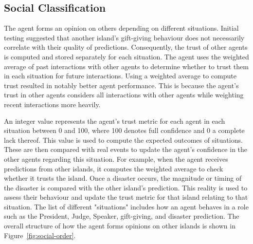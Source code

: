 \begin{figure}
    \centering
\end{figure}



\subsection{Social Classification}
The agent forms an opinion on others depending on different situations. Initial testing suggested that another island's gift-giving behaviour does not necessarily correlate with their quality of predictions. Consequently, the trust of other agents is computed and stored separately for each situation. The agent uses the weighted average of past interactions with other agents to determine whether to trust them in each situation for future interactions. Using a weighted average to compute trust resulted in notably better agent performance. This is because the agent's trust in other agents considers all interactions with other agents while weighting recent interactions more heavily.

An integer value represents the agent's trust metric for each agent in each situation between 0 and 100, where 100 denotes full confidence and 0 a complete lack thereof. This value is used to compute the expected outcomes of situations. These are then compared with real events to update the agent's confidence in the other agents regarding this situation. For example, when the agent receives predictions from other islands, it computes the weighted average to check whether it trusts the island. Once a disaster occurs, the magnitude or timing of the disaster is compared with the other island's prediction. This reality is used to assess their behaviour and update the trust metric for that island relating to that situation. The list of different "situations" includes how an agent behaves in a role such as the President, Judge, Speaker, gift-giving, and disaster prediction. The overall structure of how the agent forms opinions on other islands is shown in Figure~\ref{fig:social-order}.

